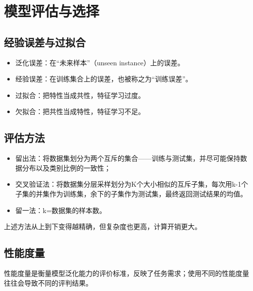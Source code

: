 \chapter{模型评估与选择}

\section{经验误差与过拟合}\label{sec:2.1}

\begin{itemize}
    \item 泛化误差：在“未来样本”（unseen instance）上的误差。
    \item 经验误差：在训练集合上的误差，也被称之为“训练误差”。
    \item 过拟合：把特性当成共性，特征学习过度。
    \item 欠拟合：把共性当成特性，特征学习不足。
\end{itemize}

\begin{figure}[!htbp]
	\centering
\end{figure}
\section{评估方法}\label{sec:2.2}
\begin{itemize}
    \item 留出法：将数据集划分为两个互斥的集合——训练与测试集，并尽可能保持数据分布以及类别比例的一致性；
    \item 交叉验证法：将数据集分层采样划分为K个大小相似的互斥子集，每次用k-1个子集的并集作为训练集，余下的子集作为测试集，最终返回测试结果的均值。
    \item 留一法：k=数据集的样本数。
\end{itemize}

上述方法从上到下变得越精确，但复杂度也更高，计算开销更大。

\section{性能度量}\label{sec:2.3}
性能度量是衡量模型泛化能力的评价标准，反映了任务需求；使用不同的性能度量往往会导致不同的评判结果。

